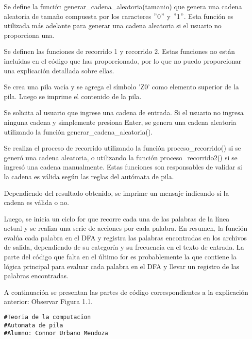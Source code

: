\begin{enumerate}
Se define la función generar\_cadena\_aleatoria(tamanio) que genera una cadena aleatoria de tamaño compuesta por los caracteres $"$0$"$ y $"$1$"$. Esta función es utilizada más adelante para generar una cadena aleatoria si el usuario no proporciona una.\newline

Se definen las funciones de recorrido 1 y recorrido 2. Estas funciones no están incluidas en el código que has proporcionado, por lo que no puedo proporcionar una explicación detallada sobre ellas.\newline

Se crea una pila vacía y se agrega el símbolo 'Z0' como elemento superior de la pila. Luego se imprime el contenido de la pila.\newline

Se solicita al usuario que ingrese una cadena de entrada. Si el usuario no ingresa ninguna cadena y simplemente presiona Enter, se genera una cadena aleatoria utilizando la función generar\_cadena\_aleatoria().\newline

Se realiza el proceso de recorrido utilizando la función proceso\_recorrido() si se generó una cadena aleatoria, o utilizando la función proceso\_recorrido2() si se ingresó una cadena manualmente. Estas funciones son responsables de validar si la cadena es válida según las reglas del autómata de pila.\newline

Dependiendo del resultado obtenido, se imprime un mensaje indicando si la cadena es válida o no.\newline

Luego, se inicia un ciclo for que recorre cada una de las palabras de la línea actual y se realiza una serie de acciones por cada palabra. En resumen, la función evalúa cada palabra en el DFA y registra las palabras encontradas en los archivos de salida, dependiendo de su categoría y su frecuencia en el texto de entrada. La parte del código que falta en el último for es probablemente la que contiene la lógica principal para evaluar cada palabra en el DFA y llevar un registro de las palabras encontradas.\newline

A continuación se presentan las partes de código correspondientes a la explicación anterior: Observar Figura 1.1.\newline
\begin{lstlisting}
#Teoria de la computacion
#Automata de pila
#Alumno: Connor Urbano Mendoza


\end{lstlisting}
\end{enumerate}
